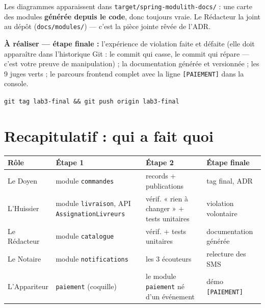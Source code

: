 \documentclass[a4paper,11pt]{article}
\begin{document}
Les diagrammes apparaissent dans \texttt{target/spring-modulith-docs/} :
une carte des modules \textbf{générée depuis le code}, donc toujours
vraie. Le Rédacteur la joint au dépôt (\texttt{docs/modules/}) --- c'est
la pièce jointe rêvée de l'ADR.

\begin{todobox}
\textbf{À réaliser --- étape finale :} l'expérience de violation faite et
défaite (elle doit apparaître dans l'historique Git : le commit qui casse,
le commit qui répare --- c'est votre preuve de manipulation) ; la
documentation générée et versionnée ; les 9 juges verts ; le parcours
frontend complet avec la ligne \texttt{[PAIEMENT]} dans la console.
\end{todobox}

\begin{tagbox}
\begin{center}
\texttt{git tag lab3-final \&\& git push origin lab3-final}
\end{center}
\end{tagbox}

\section{Recapitulatif : qui a fait quoi}

\begin{center}
\small
\begin{tabular}{p{}p{}p{}p{}}
\toprule
\textbf{Rôle} & \textbf{Étape 1} & \textbf{Étape 2} & \textbf{Étape finale} \\
\midrule
Le Doyen & module \texttt{commandes} & records + publications & tag final, ADR \\
\addlinespace
L'Huissier & module \texttt{livraison}, API \texttt{AssignationLivreurs} & vérif. « rien à changer » + tests unitaires & violation volontaire \\
\addlinespace
Le Rédacteur & module \texttt{catalogue} & vérif. + tests unitaires & documentation générée \\
\addlinespace
Le Notaire & module \texttt{notifications} & les 3 écouteurs & relecture des SMS \\
\addlinespace
L'Appariteur & \texttt{paiement} (coquille) & le module \texttt{paiement} né d'un événement & démo \texttt{[PAIEMENT]} \\
\bottomrule
\end{tabular}
\end{center}
\end{document}
